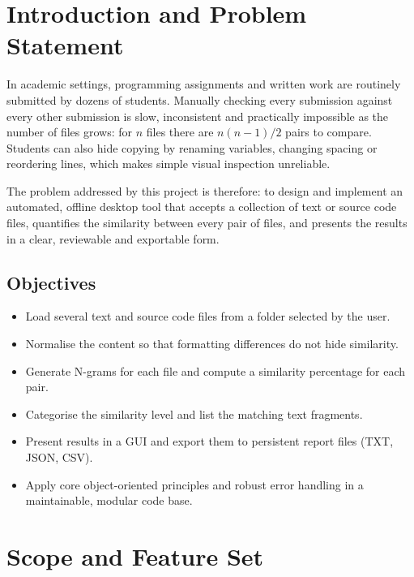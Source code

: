 \documentclass[12pt,a4paper,oneside]{book}
\begin{document}
\section{Introduction and Problem Statement}
In academic settings, programming assignments and written work are routinely submitted by dozens of students. Manually checking every submission against every other submission is slow, inconsistent and practically impossible as the number of files grows: for $n$ files there are $n(n-1)/2$ pairs to compare. Students can also hide copying by renaming variables, changing spacing or reordering lines, which makes simple visual inspection unreliable.

The problem addressed by this project is therefore: to design and implement an automated, offline desktop tool that accepts a collection of text or source code files, quantifies the similarity between every pair of files, and presents the results in a clear, reviewable and exportable form.

\subsection{Objectives}
\begin{itemize}
  \item Load several text and source code files from a folder selected by the user.
  \item Normalise the content so that formatting differences do not hide similarity.
  \item Generate N-grams for each file and compute a similarity percentage for each pair.
  \item Categorise the similarity level and list the matching text fragments.
  \item Present results in a GUI and export them to persistent report files (TXT, JSON, CSV).
  \item Apply core object-oriented principles and robust error handling in a maintainable, modular code base.
\end{itemize}

\section{Scope and Feature Set}
\end{document}
